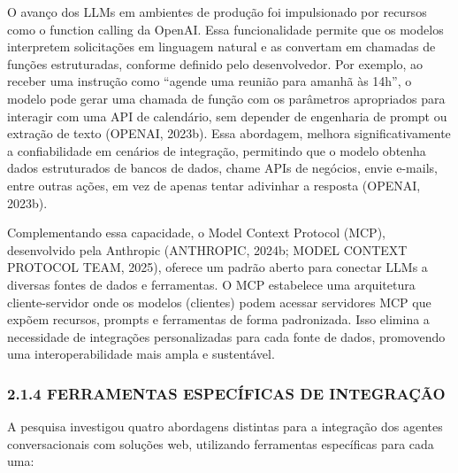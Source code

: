 \documentclass[
]{article}
\begin{document}
O avanço dos LLMs em ambientes de produção foi impulsionado por recursos
como o function calling da OpenAI. Essa funcionalidade permite que os
modelos interpretem solicitações em linguagem natural e as convertam em
chamadas de funções estruturadas, conforme definido pelo desenvolvedor.
Por exemplo, ao receber uma instrução como ``agende uma reunião para
amanhã às 14h'', o modelo pode gerar uma chamada de função com os
parâmetros apropriados para interagir com uma API de calendário, sem
depender de engenharia de prompt ou extração de texto (OPENAI, 2023b).
Essa abordagem, melhora significativamente a confiabilidade em cenários
de integração, permitindo que o modelo obtenha dados estruturados de
bancos de dados, chame APIs de negócios, envie e-mails, entre outras
ações, em vez de apenas tentar adivinhar a resposta (OPENAI, 2023b).

Complementando essa capacidade, o Model Context Protocol (MCP),
desenvolvido pela Anthropic (ANTHROPIC, 2024b; MODEL CONTEXT PROTOCOL
TEAM, 2025), oferece um padrão aberto para conectar LLMs a diversas
fontes de dados e ferramentas. O MCP estabelece uma arquitetura
cliente-servidor onde os modelos (clientes) podem acessar servidores MCP
que expõem recursos, prompts e ferramentas de forma padronizada. Isso
elimina a necessidade de integrações personalizadas para cada fonte de
dados, promovendo uma interoperabilidade mais ampla e sustentável.

\subsubsection{2.1.4 FERRAMENTAS ESPECÍFICAS DE
INTEGRAÇÃO}\label{ferramentas-especuxedficas-de-integrauxe7uxe3o}

A pesquisa investigou quatro abordagens distintas para a integração dos
agentes conversacionais com soluções web, utilizando ferramentas
específicas para cada uma:
\end{document}
